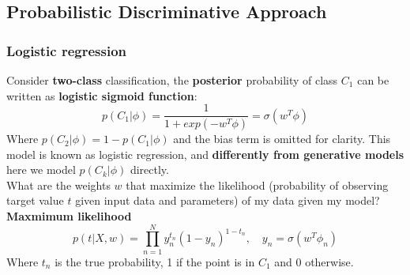 \subsection{Probabilistic Discriminative Approach}
\subsubsection{Logistic regression}
    Consider \textbf{two-class} classification, the \textbf{posterior} probability of class $C_1$ can be written as \textbf{logistic sigmoid function}:
    $$p(C_1|\phi)=\frac{1}{1+exp(-w^T\phi)}=\sigma(w^T\phi)$$
    Where $p(C_2|\phi)=1-p(C_1|\phi)$ and the bias term is omitted for clarity. This model is known as logistic regression, and \textbf{differently from generative models} here we model $p(C_k|\phi)$ directly.\\
    What are the weights $w$ that maximize the likelihood (probability of observing target value $t$ given input data and parameters) of my data given my model? \textbf{Maxmimum likelihood}
    $$p(t|X,w)=\prod_{n=1}^Ny_n^{t_n}(1-y_n)^{1-t_n},\hspace{1em}y_n=\sigma(w^T\phi_n)$$
    Where $t_n$ is the true probability, 1 if the point is in $C_1$ and 0 otherwise.

